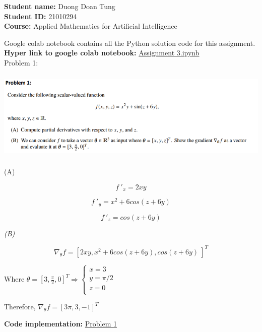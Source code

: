 \documentclass[
]{article}
\author{Duong Tung}
\date{\today}
\begin{document}
\begin{center}

    \textbf{Student name:} Duong Doan Tung\\

    \textbf{Student ID:} 21010294\\
    \textbf{Course:} Applied Mathematics for Artificial Intelligence\\

\end{center}

Google colab notebook contains all the Python solution code for this assignment.\\
\textbf{Hyper link to google colab notebook: }\href{https://colab.research.google.com/github/dtungpka/Applied-Mathematics-for-Artificial-Intelligence/blob/main/Assignment_3/Assignment%203.ipynb}{Assignment 3.ipynb}\\
Problem 1:

\includegraphics[width=6.52349in,height=1.70833in]{image1.png}




(A)

\[{f\ '}_{x} = 2xy\]

\[{f\ '}_{y} = x^{2} + 6cos(z + 6y)\]

\[{f\ '}_{z} = cos(z + 6y)\]

\emph{(B)}

\[\nabla_{\theta}f = \left\lbrack 2xy,x^{2} + 6cos(z + 6y),cos(z + 6y)\  \right\rbrack^{T}\]

Where
\(\theta = \left\lbrack 3,\frac{\pi}{2},0 \right\rbrack^{T} \Rightarrow \left\{ \begin{matrix}
    x = 3     \\
    y = \pi/2 \\
    z = 0     \\
\end{matrix} \right.\ \)

Therefore,
\(\nabla_{\theta}f = \left\lbrack 3\pi,3, - 1 \right\rbrack^{T}\)

\textbf{Code implementation:} \href{https://colab.research.google.com/github/dtungpka/Applied-Mathematics-for-Artificial-Intelligence/blob/main/Assignment_3/Assignment%203.ipynb#scrollTo=Problem_1}{Problem 1}
\end{document}
